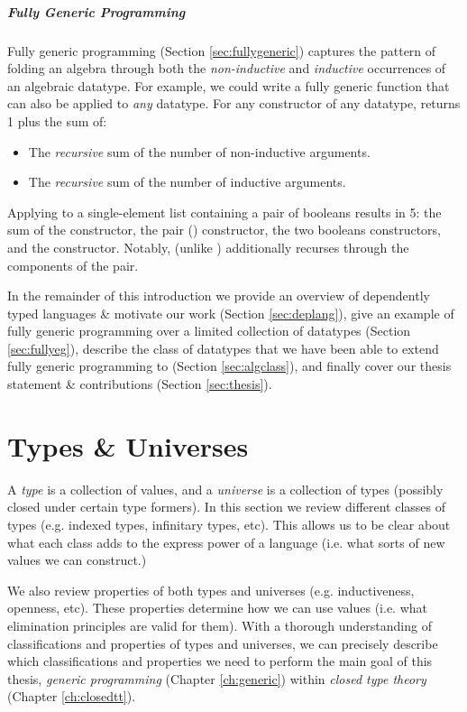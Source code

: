 \documentclass[12pt]{report}
\newcommand{\refch}[1]{Chapter \ref{ch:#1}}
\newcommand{\refsec}[1]{Section \ref{sec:#1}}
\newcommand{\AgdaCon}[1]{\AgdaInductiveConstructor{#1}}
\newcommand{\AgdaFun}[1]{\AgdaFunction{#1}}
\theoremstyle{definition}
\theoremstyle{remark}
\numberwithin{definition}{section}
\numberwithin{equation}{section}
\numberwithin{proposition}{section}
\numberwithin{conjecture}{section}
\numberwithin{theorem}{section}
\numberwithin{lemma}{section}
\numberwithin{corollary}{section}
\numberwithin{example}{section}
\numberwithin{remark}{section}
\begin{document}
\paragraph{Fully Generic Programming}
Fully generic programming (\refsec{fullygeneric}) captures the pattern of folding an
algebra through both the \textit{non-inductive} and \textit{inductive}
occurrences of an algebraic datatype.
For example, we could write a fully generic \AgdaFun{count} function that
can also be applied to \textit{any} datatype.
For any constructor of any datatype, \AgdaFun{count}
returns 1 plus the sum of:
\begin{itemize}
\item The \textit{recursive} sum of the number of non-inductive arguments.
\item The \textit{recursive} sum of the number of inductive arguments.
\end{itemize}
Applying \AgdaFun{count}
to a single-element list containing a pair of booleans
results in 5: the sum of
the \AgdaCon{cons} constructor,
the pair (\AgdaCon{,}) constructor,
the two booleans constructors,
and the \AgdaCon{nil} constructor.
Notably, \AgdaFun{count} (unlike \AgdaFun{size}) additionally
recurses through the components of the pair.

In the remainder of this introduction we
provide an overview of dependently typed languages
\& motivate our work (\refsec{deplang}),
give an example of fully generic programming over a limited collection
of datatypes (\refsec{fullyeg}),
describe the class of datatypes that we have been able to extend
fully generic programming to (\refsec{algclass}),
and finally cover our thesis statement \& contributions
(\refsec{thesis}).



\chapter{Types \& Universes}\label{ch:univ}

A \textit{type} is a collection of values, and a \textit{universe} is
a collection of types (possibly closed under certain type formers).
In this section we review different classes of types (e.g. indexed
types, infinitary types, etc).
This allows us to be clear about what each class adds
to the express power of a language (i.e. what sorts of new values we
can construct.)

We also review properties of both types and universes
(e.g. inductiveness, openness, etc). These properties determine how we
can use values (i.e. what elimination principles are valid for them).
With a thorough understanding of classifications and
properties of types and universes, we can precisely describe which
classifications and properties we need to perform the main goal of
this thesis, \textit{generic programming} (\refch{generic}) within
\textit{closed type theory} (\refch{closedtt}).
\end{document}
